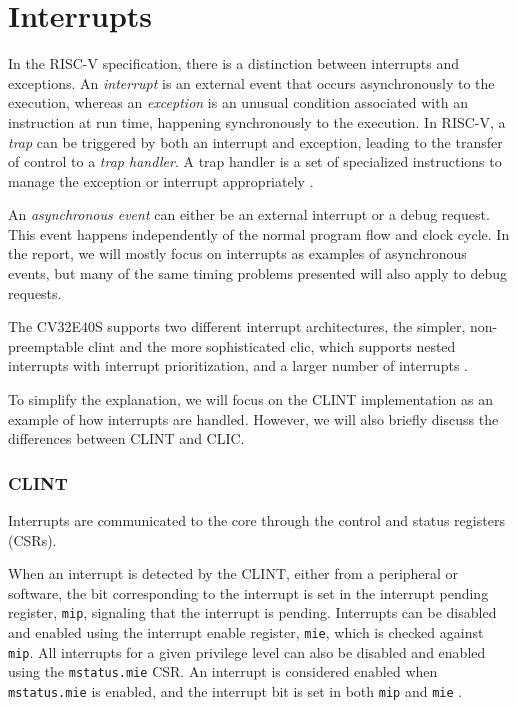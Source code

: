 \section{Interrupts}
\label{sec:bg_interrupts}

In the RISC-V specification, there is a distinction between interrupts and exceptions. An \textit{interrupt} is an external event that occurs asynchronously to the execution, whereas an \textit{exception} is an unusual condition associated with an instruction at run time, happening synchronously to the execution. In RISC-V, a \textit{trap} can be triggered by both an interrupt and exception, leading to the transfer of control to a \textit{trap handler}. A trap handler is a set of specialized instructions to manage the exception or interrupt appropriately \cite{watermanRISCVInstructionSet2021}. 

An \textit{asynchronous event} can either be an external interrupt or a debug request. This event happens independently of the normal program flow and clock cycle. In the report, we will mostly focus on interrupts as examples of asynchronous events, but many of the same timing problems presented will also apply to debug requests.


The CV32E40S supports two different interrupt architectures, the simpler, non-preemptable \acrfull{clint} and the more sophisticated \acrfull{clic}, which supports nested interrupts with interrupt prioritization, and a larger number of interrupts \cite{openhwgroupExceptionsInterruptsCOREV2023}. 


To simplify the explanation, we will focus on the CLINT implementation as an example of how interrupts are handled. However, we will also briefly discuss the differences between CLINT and CLIC. 

\subsubsection{CLINT}
Interrupts are communicated to the core through the control and status registers (CSRs).

When an interrupt is detected by the CLINT, either from a peripheral or software, the bit corresponding to the interrupt is set in the interrupt pending register, \lstinline{mip}, signaling that the interrupt is pending.
Interrupts can be disabled and enabled using the interrupt enable register, \lstinline{mie}, which is checked against \lstinline{mip}. All interrupts for a given privilege level can also be disabled and enabled using the \lstinline{mstatus.mie} CSR. An interrupt is considered enabled when \lstinline{mstatus.mie} is enabled, and the interrupt bit is set in both \lstinline{mip} and \lstinline{mie} \cite{watermanRISCVInstructionSet2021}.

